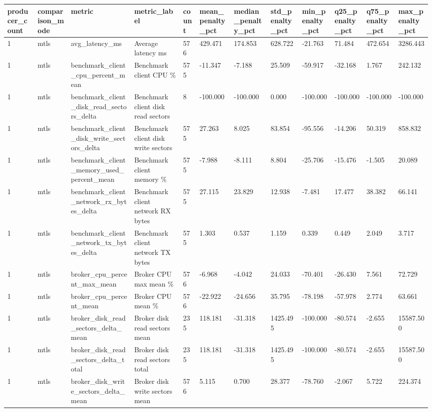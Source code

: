 \begin{longtable}{llllllllllll}
\hline
producer\_count & comparison\_mode & metric & metric\_label & count & mean\_penalty\_pct & median\_penalty\_pct & std\_penalty\_pct & min\_penalty\_pct & q25\_penalty\_pct & q75\_penalty\_pct & max\_penalty\_pct \\
\hline
1 & mtls & avg\_latency\_ms & Average latency ms & 576 & 429.471 & 174.853 & 628.722 & -21.763 & 71.484 & 472.654 & 3286.443 \\
1 & mtls & benchmark\_client\_cpu\_percent\_mean & Benchmark client CPU \% & 575 & -11.347 & -7.188 & 25.509 & -59.917 & -32.168 & 1.767 & 242.132 \\
1 & mtls & benchmark\_client\_disk\_read\_sectors\_delta & Benchmark client disk read sectors & 8 & -100.000 & -100.000 & 0.000 & -100.000 & -100.000 & -100.000 & -100.000 \\
1 & mtls & benchmark\_client\_disk\_write\_sectors\_delta & Benchmark client disk write sectors & 575 & 27.263 & 8.025 & 83.854 & -95.556 & -14.206 & 50.319 & 858.832 \\
1 & mtls & benchmark\_client\_memory\_used\_percent\_mean & Benchmark client memory \% & 575 & -7.988 & -8.111 & 8.804 & -25.706 & -15.476 & -1.505 & 20.089 \\
1 & mtls & benchmark\_client\_network\_rx\_bytes\_delta & Benchmark client network RX bytes & 575 & 27.115 & 23.829 & 12.938 & -7.481 & 17.477 & 38.382 & 66.141 \\
1 & mtls & benchmark\_client\_network\_tx\_bytes\_delta & Benchmark client network TX bytes & 575 & 1.303 & 0.537 & 1.159 & 0.339 & 0.449 & 2.049 & 3.717 \\
1 & mtls & broker\_cpu\_percent\_max\_mean & Broker CPU max mean \% & 576 & -6.968 & -4.042 & 24.033 & -70.401 & -26.430 & 7.561 & 72.729 \\
1 & mtls & broker\_cpu\_percent\_mean & Broker CPU mean \% & 576 & -22.922 & -24.656 & 35.795 & -78.198 & -57.978 & 2.774 & 63.661 \\
1 & mtls & broker\_disk\_read\_sectors\_delta\_mean & Broker disk read sectors mean & 235 & 118.181 & -31.318 & 1425.495 & -100.000 & -80.574 & -2.655 & 15587.500 \\
1 & mtls & broker\_disk\_read\_sectors\_delta\_total & Broker disk read sectors total & 235 & 118.181 & -31.318 & 1425.495 & -100.000 & -80.574 & -2.655 & 15587.500 \\
1 & mtls & broker\_disk\_write\_sectors\_delta\_mean & Broker disk write sectors mean & 576 & 5.115 & 0.700 & 28.377 & -78.760 & -2.067 & 5.722 & 224.374 \\

\end{longtable}
